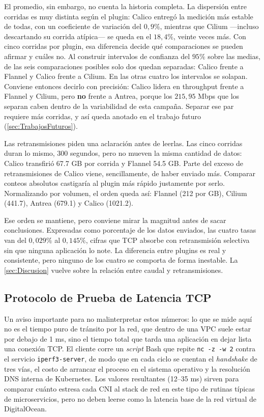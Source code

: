El promedio, sin embargo, no cuenta la historia completa. La dispersión entre corridas es muy distinta según el plugin: Calico entregó la medición más estable de todas, con un coeficiente de variación del $0{,}9\%$, mientras que Cilium ---incluso descartando su corrida atípica--- se queda en el $18{,}4\%$, veinte veces más. Con cinco corridas por plugin, esa diferencia decide qué comparaciones se pueden afirmar y cuáles no. Al construir intervalos de confianza del $95\%$ sobre las medias, de las seis comparaciones posibles solo dos quedan separadas: Calico frente a Flannel y Calico frente a Cilium. En las otras cuatro los intervalos se solapan. Conviene entonces decirlo con precisión: Calico lidera en throughput frente a Flannel y Cilium, pero \textbf{no} frente a Antrea, porque los $215{,}95$ Mbps que los separan caben dentro de la variabilidad de esta campaña. Separar ese par requiere más corridas, y así queda anotado en el trabajo futuro (\cref{sec:TrabajosFuturos}).

Las retransmisiones piden una aclaración antes de leerlas. Las cinco corridas duran lo mismo, 300 segundos, pero no mueven la misma cantidad de datos: Calico transfirió 67.7 GB por corrida y Flannel 54.5 GB. Parte del exceso de retransmisiones de Calico viene, sencillamente, de haber enviado más. Comparar conteos absolutos castigaría al plugin más rápido justamente por serlo. Normalizando por volumen, el orden queda así: Flannel (212 por GB), Cilium (441.7), Antrea (679.1) y Calico (1021.2).

Ese orden se mantiene, pero conviene mirar la magnitud antes de sacar conclusiones. Expresadas como porcentaje de los datos enviados, las cuatro tasas van del $0{,}029\%$ al $0{,}145\%$, cifras que TCP absorbe con retransmisión selectiva sin que ninguna aplicación lo note. La diferencia entre plugins es real y consistente, pero ninguno de los cuatro se comporta de forma inestable. La \cref{sec:Discusion} vuelve sobre la relación entre caudal y retransmisiones.

\subsection{Protocolo de Prueba de Latencia TCP}

Un aviso importante para no malinterpretar estos números: lo que se mide aquí no es el tiempo puro de tránsito por la red, que dentro de una VPC suele estar por debajo de 1 ms, sino el tiempo total que tarda una aplicación en dejar lista una conexión TCP. El cliente corre un \emph{script} Bash que repite \texttt{nc -z -w 2} contra el servicio \texttt{iperf3-server}, de modo que en cada ciclo se cuentan el \emph{handshake} de tres vías, el costo de arrancar el proceso en el sistema operativo y la resolución DNS interna de Kubernetes. Los valores resultantes (12--35 ms) sirven para comparar cuánto estresa cada CNI al stack de red en este tipo de rutinas típicas de microservicios, pero no deben leerse como la latencia base de la red virtual de DigitalOcean.

